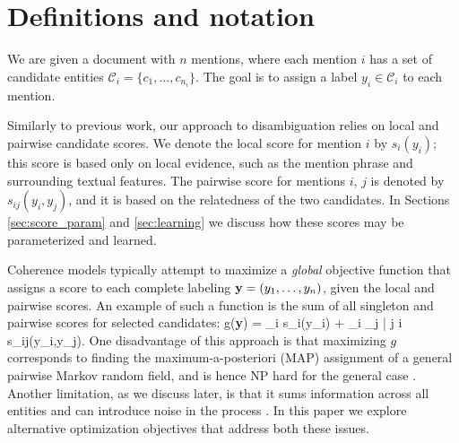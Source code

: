 

\section{Definitions and notation}

We are given a document with $n$ mentions, where each mention $i$ has a set of candidate entities $\mathcal{C}_i = \{c_1, ..., c_{n_i}\}$. The goal is to assign a label $y_i \in \mathcal{C}_i$ to each mention.

Similarly to previous work, our approach to disambiguation relies on local and pairwise candidate scores. We denote the local score for mention $i$ by $s_i(y_i)$; this score is based only on local evidence, such as the mention phrase and surrounding textual features. The pairwise score for mentions $i$, $j$ is denoted by $s_{ij}(y_i, y_j)$,  and it is based on the relatedness of the two candidates. In Sections \ref{sec:score_param} and \ref{sec:learning} we discuss how these scores may be parameterized and learned. 


Coherence models typically attempt to maximize a {\em global} objective function that assigns a score to each complete labeling ${\bf y} = (y_1,\ldots, y_n)$, given the local and pairwise scores. An example of such a function is the sum of all singleton and pairwise scores for selected candidates:
\be
g({\bf y}) = \sum_i s_i(y_i) + \sum_i \sum_{j | j \neq i} s_{ij}(y_i,y_j).
\label{eq:global_obj}
\ee 
One disadvantage of this approach is that maximizing $g$ corresponds to finding the maximum-a-posteriori (MAP) assignment of a general pairwise Markov random field, and is hence
NP hard for the general case \cite{wainwright2008graphical}. Another limitation, as we discuss later, is that it sums information across all entities and can introduce noise in the process . In this paper we explore alternative optimization objectives that address both these issues.
